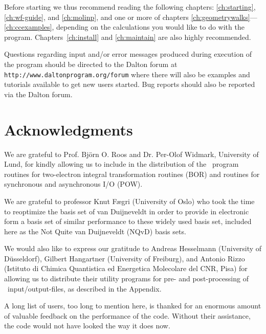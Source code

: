 Before starting we thus recommend reading
the following chapters: \ref{ch:starting}, \ref{ch:wf-guide}, and
\ref{ch:molinp}, and one or more of chapters
\ref{ch:geometrywalks}---\ref{ch:ccexamples}, depending on the
calculations you would like to do with the
program. Chapters~\ref{ch:install} and \ref{ch:maintain} are also
highly recommended.

Questions regarding input and/or error messages produced during execution of the program
should be directed to the Dalton forum at
\verb|http://www.daltonprogram.org/forum| where there will also be examples 
and tutorials available to get new users started. Bug 
reports should also be reported via the Dalton forum.

\section{Acknowledgments}

We are grateful to Prof. Bj\"{o}rn O. Roos and Dr. Per-Olof
Widmark, University of Lund, for kindly allowing us to include in
the distribution of the \dalton\ program routines for
two-electron integral transformation routines
(BOR) and routines for synchronous and asynchronous I/O (POW).

We are grateful to professor Knut F\ae gri (University of Oslo) who
took the time to reoptimize the basis set of van Duijneveldt in order
to provide in electronic form a basis set of similar performance to
these widely used basis set, included here as the Not Quite van
Duijneveldt (NQvD) basis sets.

We would also like to express our gratitude to Andreas Hesselmann
(University of D\"{u}sseldorf), Gilbert Hangartner (University of
Freiburg), and Antonio
Rizzo (Istituto di Chimica Quantistica ed Energetica Molecolare del
CNR, Pisa) for allowing us to distribute their utility programs for
pre- and post-processing of \dalton\ input/output-files, as described
in the Appendix.

A long list of users, too long to mention here, is thanked for an
enormous amount of valuable feedback on the performance of the
code. Without their assistance, the code would not have looked the
way it does now.
